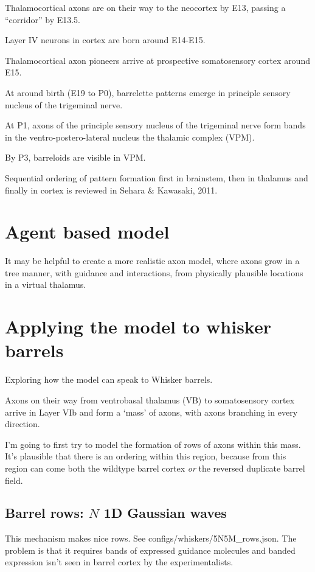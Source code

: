 \documentclass[11pt, a4paper]{article}
\newcommand{\code}[1]{\textsf{#1}}
\begin{document}
Thalamocortical axons are on their way to the neocortex by E13,
passing a ``corridor'' by E13.5.

Layer IV neurons in cortex are born around E14-E15.

Thalamocortical axon pioneers arrive at prospective somatosensory
cortex around E15.

At around birth (E19 to P0), barrelette patterns emerge in principle
sensory nucleus of the trigeminal nerve.

At P1, axons of the principle sensory nucleus of the trigeminal nerve
form bands in the ventro-postero-lateral nucleus the thalamic complex
(VPM).

By P3, barreloids are visible in VPM.

Sequential ordering of pattern formation first in brainstem, then in
thalamus and finally in cortex is reviewed in Sehara \& Kawasaki, 2011.

\section{Agent based model}

It may be helpful to create a more realistic axon model, where axons
grow in a tree manner, with guidance and interactions, from physically
plausible locations in a virtual thalamus.

\section{Applying the model to whisker barrels}

Exploring how the model can speak to Whisker barrels.

Axons on their way from ventrobasal thalamus (VB) to somatosensory
cortex arrive in Layer VIb and form a `mass' of axons, with axons
branching in every direction.

I'm going to first try to model the formation of rows of axons within
this mass. It's plausible that there is an ordering within this
region, because from this region can come both the wildtype barrel
cortex \emph{or} the reversed duplicate barrel field.

\subsection{Barrel rows: $N$ 1D Gaussian waves}

This mechanism makes nice
rows. See \code{configs/whiskers/5N5M\_rows.json}. The problem is that
it requires bands of expressed guidance molecules and banded
expression isn't seen in barrel cortex by the experimentalists.
\end{document}
